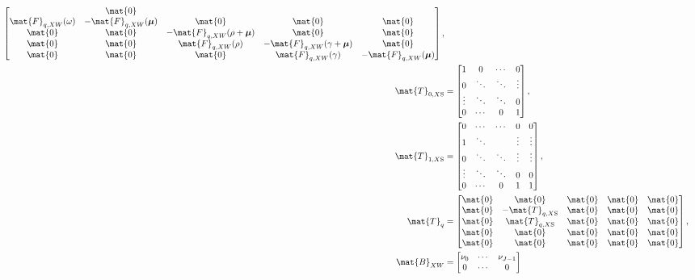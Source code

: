 \documentclass{jpmarticle}
\renewcommand{\vec}[1]{\boldsymbol{\mathrm{#1}}}
\let\subequationsorig\subequations%
\let\endsubequationsorig\endsubequations%
\renewenvironment{subequations}{
  \subequationsorig
  \renewcommand{\theequation}{\theparentequation.\arabic{equation}}
}{
  \endsubequationsorig
}
\begin{document}
\begin{subequations}
\begin{align}
\begin{bmatrix}
      & \mat{0}
      \\
      \mat{F}_{q, XW}(\omega) & - \mat{F}_{q, XW}(\vec{\mu})
      & \mat{0} & \mat{0} & \mat{0}
      \\
      \mat{0} & \mat{0} & - \mat{F}_{q, XW}(\rho + \vec{\mu}) & \mat{0}
      & \mat{0}
      \\
      \mat{0} & \mat{0} & \mat{F}_{q, XW}(\rho)
      & - \mat{F}_{q, XW}(\gamma + \vec{\mu}) & \mat{0}
      \\
      \mat{0} & \mat{0} & \mat{0} & \mat{F}_{q, XW}(\gamma)
      & - \mat{F}_{q, XW}(\vec{\mu})
    \end{bmatrix},
    \\
    \mat{T}_{0, X\mathrm{S}} &=
    \begin{bmatrix}
      1 & 0 & \cdots & 0
      \\
      0 & \ddots & \ddots & \vdots
      \\
      \vdots & \ddots & \ddots & 0
      \\
      0 & \cdots & 0 & 1
    \end{bmatrix},
    \\
    \mat{T}_{1, X\mathrm{S}} &=
    \begin{bmatrix}
      0 & \cdots & \cdots & 0 & 0
      \\
      1 & \ddots & & \vdots & \vdots
      \\
      0 & \ddots & \ddots & \vdots & \vdots
      \\
      \vdots & \ddots & \ddots & 0 & 0
      \\
      0 & \cdots & 0 & 1 & 1
    \end{bmatrix},
    \\
    \mat{T}_q &=
    \begin{bmatrix}
      \mat{0} & \mat{0} & \mat{0} & \mat{0} & \mat{0}
      \\
      \mat{0} & - \mat{T}_{q, X\mathrm{S}} & \mat{0} & \mat{0} & \mat{0}
      \\
      \mat{0} & \mat{T}_{q, X\mathrm{S}} & \mat{0} & \mat{0} & \mat{0}
      \\
      \mat{0} & \mat{0} & \mat{0} & \mat{0} & \mat{0}
      \\
      \mat{0} & \mat{0} & \mat{0} & \mat{0} & \mat{0}
    \end{bmatrix},
    \\
    \mat{B}_{XW} &=
    \begin{bmatrix}
      \nu_0 & \cdots & \nu_{J - 1} \\
      0 & \cdots & 0 \\

\end{bmatrix}
\end{align}
\end{subequations}
\end{document}
